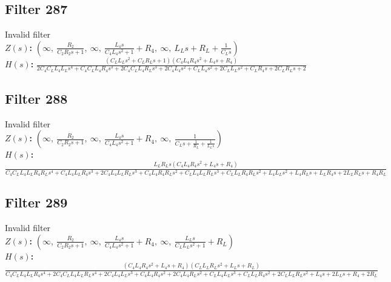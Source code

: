 \documentclass{article}
\begin{document}
\subsection*{Filter 287}
Invalid filter \\ 
\textbf{$Z(s)$:} $\left( \infty, \  \frac{R_{2}}{C_{2} R_{2} s + 1}, \  \infty, \  \frac{L_{4} s}{C_{4} L_{4} s^{2} + 1} + R_{4}, \  \infty, \  L_{L} s + R_{L} + \frac{1}{C_{L} s}\right)$ \\ 
\textbf{$H(s)$:} $\frac{\left(C_{L} L_{L} s^{2} + C_{L} R_{L} s + 1\right) \left(C_{4} L_{4} R_{4} s^{2} + L_{4} s + R_{4}\right)}{2 C_{4} C_{L} L_{4} L_{L} s^{4} + C_{4} C_{L} L_{4} R_{4} s^{3} + 2 C_{4} C_{L} L_{4} R_{L} s^{3} + 2 C_{4} L_{4} s^{2} + C_{L} L_{4} s^{2} + 2 C_{L} L_{L} s^{2} + C_{L} R_{4} s + 2 C_{L} R_{L} s + 2}$ \\ 
\subsection*{Filter 288}
Invalid filter \\ 
\textbf{$Z(s)$:} $\left( \infty, \  \frac{R_{2}}{C_{2} R_{2} s + 1}, \  \infty, \  \frac{L_{4} s}{C_{4} L_{4} s^{2} + 1} + R_{4}, \  \infty, \  \frac{1}{C_{L} s + \frac{1}{R_{L}} + \frac{1}{L_{L} s}}\right)$ \\ 
\textbf{$H(s)$:} $\frac{L_{L} R_{L} s \left(C_{4} L_{4} R_{4} s^{2} + L_{4} s + R_{4}\right)}{C_{4} C_{L} L_{4} L_{L} R_{4} R_{L} s^{4} + C_{4} L_{4} L_{L} R_{4} s^{3} + 2 C_{4} L_{4} L_{L} R_{L} s^{3} + C_{4} L_{4} R_{4} R_{L} s^{2} + C_{L} L_{4} L_{L} R_{L} s^{3} + C_{L} L_{L} R_{4} R_{L} s^{2} + L_{4} L_{L} s^{2} + L_{4} R_{L} s + L_{L} R_{4} s + 2 L_{L} R_{L} s + R_{4} R_{L}}$ \\ 
\subsection*{Filter 289}
Invalid filter \\ 
\textbf{$Z(s)$:} $\left( \infty, \  \frac{R_{2}}{C_{2} R_{2} s + 1}, \  \infty, \  \frac{L_{4} s}{C_{4} L_{4} s^{2} + 1} + R_{4}, \  \infty, \  \frac{L_{L} s}{C_{L} L_{L} s^{2} + 1} + R_{L}\right)$ \\ 
\textbf{$H(s)$:} $\frac{\left(C_{4} L_{4} R_{4} s^{2} + L_{4} s + R_{4}\right) \left(C_{L} L_{L} R_{L} s^{2} + L_{L} s + R_{L}\right)}{C_{4} C_{L} L_{4} L_{L} R_{4} s^{4} + 2 C_{4} C_{L} L_{4} L_{L} R_{L} s^{4} + 2 C_{4} L_{4} L_{L} s^{3} + C_{4} L_{4} R_{4} s^{2} + 2 C_{4} L_{4} R_{L} s^{2} + C_{L} L_{4} L_{L} s^{3} + C_{L} L_{L} R_{4} s^{2} + 2 C_{L} L_{L} R_{L} s^{2} + L_{4} s + 2 L_{L} s + R_{4} + 2 R_{L}}$ \\ 
\end{document}
